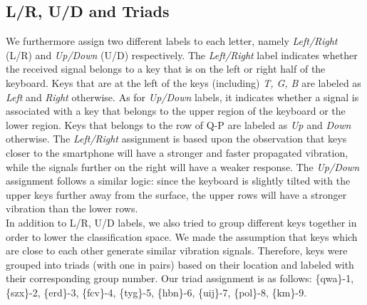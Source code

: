 \documentclass[11pt,conference]{IEEEtran}
\begin{document}
\subsection{L/R, U/D and Triads}
\label{sec:labeler}
We furthermore assign two different labels to each letter, namely \emph{Left/Right} (L/R) and \emph{Up/Down} (U/D) respectively. The \emph{Left/Right} label indicates whether the received signal belongs to a key that is on the left or right half of the keyboard. Keys that are at the left of the keys (including) \emph{T, G, B} are labeled as \emph{Left} and \emph{Right} otherwise. As for \emph{Up/Down} labels, it indicates whether a signal is associated with a key that belongs to the upper region of the keyboard or the lower region. Keys that belongs to the row of Q-P are labeled as \emph{Up} and \emph{Down} otherwise. The \emph{Left/Right} assignment is based upon the observation that keys closer to the smartphone will have a stronger and faster propagated vibration, while the signals further on the right will have a weaker response. The \emph{Up/Down} assignment follows a similar logic: since the keyboard is slightly tilted with the upper keys further away from the surface, the upper rows will have a stronger vibration than the lower rows.\\

In addition to L/R, U/D labels, we also tried to group different keys together in order to lower the classification space. We made the assumption that keys which are close to each other generate similar vibration signals. Therefore, keys were grouped into triads (with one in pairs) based on their location and labeled with their corresponding group number.
Our triad assignment is as follows:
\{qwa\}-1, \{szx\}-2, \{erd\}-3, \{fcv\}-4, \{tyg\}-5, \{hbn\}-6, \{uij\}-7, \{pol\}-8, \{km\}-9.
\end{document}
